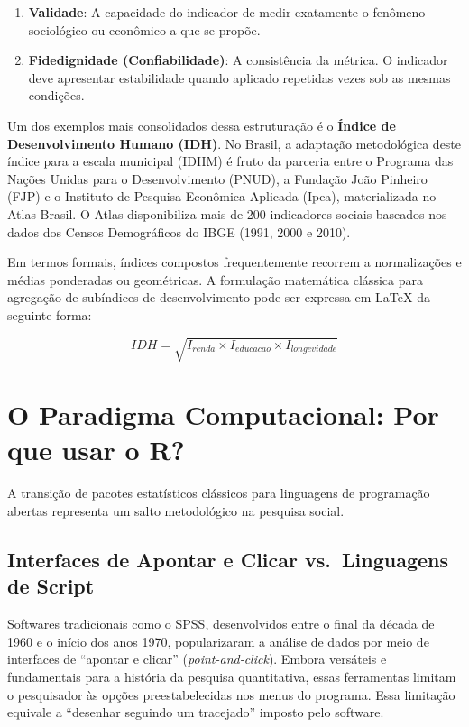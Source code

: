 \documentclass[
  brazilian,
  11pt,
  a4paper,
  open = right,
  twoside = true]{scrbook}
\providecommand{\tightlist}{%
  \setlength{\itemsep}{0pt}\setlength{\parskip}{0pt}}
\begin{document}
\begin{enumerate}
\def\labelenumi{\arabic{enumi}.}
\tightlist
\item
  \textbf{Validade}: A capacidade do indicador de medir exatamente o
  fenômeno sociológico ou econômico a que se propõe.
\item
  \textbf{Fidedignidade (Confiabilidade)}: A consistência da métrica. O
  indicador deve apresentar estabilidade quando aplicado repetidas vezes
  sob as mesmas condições.
\end{enumerate}

Um dos exemplos mais consolidados dessa estruturação é o \textbf{Índice
de Desenvolvimento Humano (IDH)}. No Brasil, a adaptação metodológica
deste índice para a escala municipal (IDHM) é fruto da parceria entre o
Programa das Nações Unidas para o Desenvolvimento (PNUD), a Fundação
João Pinheiro (FJP) e o Instituto de Pesquisa Econômica Aplicada (Ipea),
materializada no Atlas Brasil. O Atlas disponibiliza mais de 200
indicadores sociais baseados nos dados dos Censos Demográficos do IBGE
(1991, 2000 e 2010).

Em termos formais, índices compostos frequentemente recorrem a
normalizações e médias ponderadas ou geométricas. A formulação
matemática clássica para agregação de subíndices de desenvolvimento pode
ser expressa em LaTeX da seguinte forma:

\[ 
IDH = \sqrt{I_{renda} \times I_{educacao} \times I_{longevidade}} 
\]

\chapter{O Paradigma Computacional: Por que usar o
R?}\label{o-paradigma-computacional-por-que-usar-o-r}

A transição de pacotes estatísticos clássicos para linguagens de
programação abertas representa um salto metodológico na pesquisa social.

\section{Interfaces de Apontar e Clicar vs.~Linguagens de
Script}\label{interfaces-de-apontar-e-clicar-vs.-linguagens-de-script}

Softwares tradicionais como o SPSS, desenvolvidos entre o final da
década de 1960 e o início dos anos 1970, popularizaram a análise de
dados por meio de interfaces de ``apontar e clicar''
(\emph{point-and-click}). Embora versáteis e fundamentais para a
história da pesquisa quantitativa, essas ferramentas limitam o
pesquisador às opções preestabelecidas nos menus do programa. Essa
limitação equivale a ``desenhar seguindo um tracejado'' imposto pelo
software.
\end{document}
